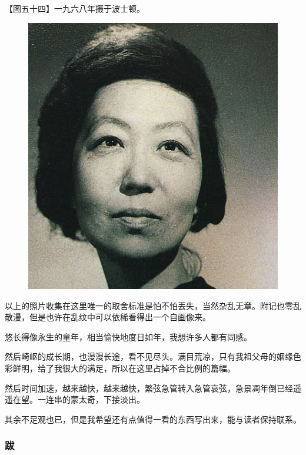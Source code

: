 \clearpage
\par 【图五十四】一九六八年摄于波士顿。
\begin{figure}[htb]
    \centering %
    \includegraphics[scale=0.4]{picture/对照记54.jpeg}
\end{figure}




\par 以上的照片收集在这里唯一的取舍标准是怕不怕丢失，当然杂乱无章。附记也零乱散漫，但是也许在乱纹中可以依稀看得出一个自画像来。
\par 悠长得像永生的童年，相当愉快地度日如年，我想许多人都有同感。
\par 然后崎岖的成长期，也漫漫长途，看不见尽头。满目荒凉，只有我祖父母的姻缘色彩鲜明，给了我很大的满足，所以在这里占掉不合比例的篇幅。
\par 然后时间加速，越来越快，越来越快，繁弦急管转入急管哀弦，急景凋年倒已经遥遥在望。一连串的蒙太奇，下接淡出。
\par 其余不足观也已，但是我希望还有点值得一看的东西写出来，能与读者保持联系。



\subsubsection*{跋}


